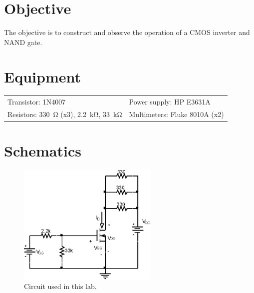 

\section{Objective}
\label{sec:objective}

The objective is to construct and observe the operation of a CMOS inverter and NAND gate.

\section{Equipment}
\label{sec:equipment}

\begin{tabular}{ll}
  \centering
  Transistor: 1N4007 & Power supply: HP E3631A \\
  Resistors: \SI{330}{\ohm} (x3), \SI{2.2}{\kilo\ohm}, \SI{33}{\kilo\ohm} & Multimeters: Fluke 8010A (x2) \\
\end{tabular}

\section{Schematics}
\label{sec:schematics}

\begin{figure}[hbtp]
  \centering
  \includegraphics[width=0.6\textwidth]{circuit}
  \caption{\label{fig:circuit} Circuit used in this lab.}
\end{figure}

